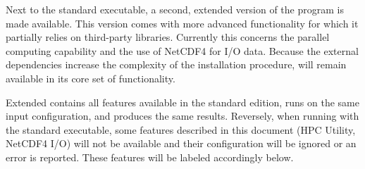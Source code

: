 Next to the standard \mf executable, a second, extended version of the program is made available. This version comes with more advanced functionality for which it partially relies on third-party libraries. Currently this concerns the parallel computing capability and the use of NetCDF4 for I/O data. Because the external dependencies increase the complexity of the installation procedure, \mf will remain available in its core set of functionality.

Extended \mf contains all features available in the standard edition, runs on the same input configuration, and produces the same results. Reversely, when running with the standard executable, some features described in this document (HPC Utility, NetCDF4 I/O) will not be available and their configuration will be ignored or an error is reported. These features will be labeled accordingly below.